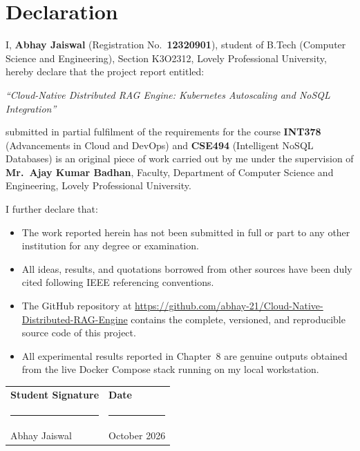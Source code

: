 \documentclass[12pt,a4paper]{report}
\begin{document}
\chapter*{Declaration}

I, \textbf{Abhay Jaiswal} (Registration No.\ \textbf{12320901}), student of
B.Tech (Computer Science and Engineering), Section K3O2312, Lovely Professional
University, hereby declare that the project report entitled:

\begin{center}
  \textit{``Cloud-Native Distributed RAG Engine: Kubernetes Autoscaling
  and NoSQL Integration''}
\end{center}

submitted in partial fulfilment of the requirements for the course
\textbf{INT378} (Advancements in Cloud and DevOps) and \textbf{CSE494}
(Intelligent NoSQL Databases) is an original piece of work carried out by me
under the supervision of \textbf{Mr.\ Ajay Kumar Badhan}, Faculty, Department
of Computer Science and Engineering, Lovely Professional University.

I further declare that:
\begin{itemize}[leftmargin=1.5cm]
  \item The work reported herein has not been submitted in full or part to any
        other institution for any degree or examination.
  \item All ideas, results, and quotations borrowed from other sources have been
        duly cited following IEEE referencing conventions.
  \item The GitHub repository at
        \href{https://github.com/abhay-21/Cloud-Native-Distributed-RAG-Engine}{https://github.com/abhay-21/Cloud-Native-Distributed-RAG-Engine} contains the
        complete, versioned, and reproducible source code of this project.
  \item All experimental results reported in Chapter~8 are genuine outputs
        obtained from the live Docker Compose stack running on my local workstation.
\end{itemize}

\vspace{2cm}
\noindent
\begin{tabular}{p{6cm}p{6cm}}
  \textbf{Student Signature} & \textbf{Date} \\[1.5cm]
  \rule{5cm}{0.4pt}         & \rule{5cm}{0.4pt} \\
  Abhay Jaiswal              & October 2026 \\
\end{tabular}
\end{document}
